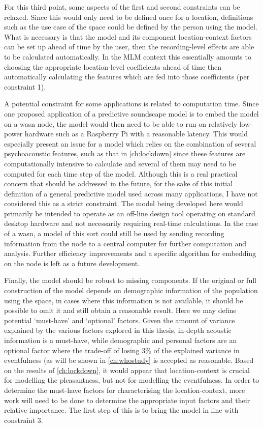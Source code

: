 For this third point, some aspects of the first and second constraints can be relaxed. Since this would only need to be defined once for a location, definitions such as the use case of the space could be defined by the person using the model. What is necessary is that the model and its component location-context factors can be set up ahead of time by the user, then the recording-level effects are able to be calculated automatically. In the MLM context this essentially amounts to choosing the appropriate location-level coefficients ahead of time then automatically calculating the features which are fed into those coefficients (per constraint 1).

A potential constraint for some applications is related to computation time. Since one proposed application of a predictive soundscape model is to embed the model on a \gls{wasn} node, the model would then need to be able to run on relatively low-power hardware such as a Raspberry Pi with a reasonable latency. This would especially present an issue for a model which relies on the combination of several psychoacoustic features, such as that in \cref{ch:lockdown} since these features are computationally intensive to calculate and several of them may need to be computed for each time step of the model. Although this is a real practical concern that should be addressed in the future, for the sake of this initial definition of a general predictive model used across many applications, I have not considered this as a strict constraint. The model being developed here would primarily be intended to operate as an off-line design tool operating on standard desktop hardware and not necessarily requiring real-time calculations. In the case of a \gls{wasn}, a model of this sort could still be used by sending recording information from the node to a central computer for further computation and analysis. Further efficiency improvements and a specific algorithm for embedding on the node is left as a future development.

Finally, the model should be robust to missing components. If the original or full construction of the model depends on demographic information of the population using the space, in cases where this information is not available, it should be possible to omit it and still obtain a reasonable result. Here we may define potential `must-have’ and `optional’ factors. Given the amount of variance explained by the various factors explored in this thesis, in-depth acoustic information is a must-have, while demographic and personal factors are an optional factor where the trade-off of losing 3\% of the explained variance in eventfulness (as will be shown in \cref{ch:whostudy} is accepted as reasonable. Based on the results of \cref{ch:lockdown}, it would appear that location-context is crucial for modelling the pleasantness, but not for modelling the eventfulness. In order to determine the must-have factors for characterising the location-context, more work will need to be done to determine the appropriate input factors and their relative importance. The first step of this is to bring the model in line with constraint 3. 


